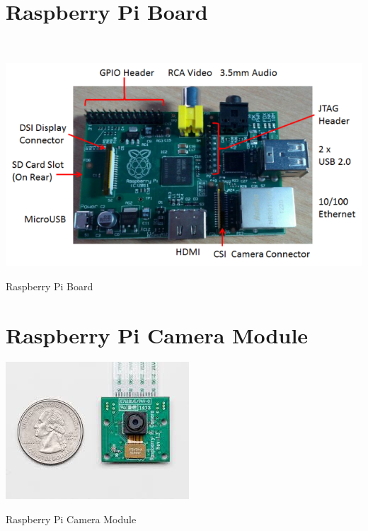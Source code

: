 \documentclass[12pt, a4paper]{article}
\begin{document}
{\begin{appendices}
\section{Raspberry Pi Board}
~\\
\begin{appendixfig}
\centering
\includegraphics[scale=1.00]{RPiModelB.png}
\caption{Raspberry Pi Board}
\label{}
\end{appendixfig}

\newpage
\section{Raspberry Pi Camera Module}
\begin{appendixfig}
\centering
\includegraphics[scale=1.00]{index.jpeg}
\caption{Raspberry Pi Camera Module}
\label{}
\end{appendixfig}


\end{appendices}}
\end{document}
